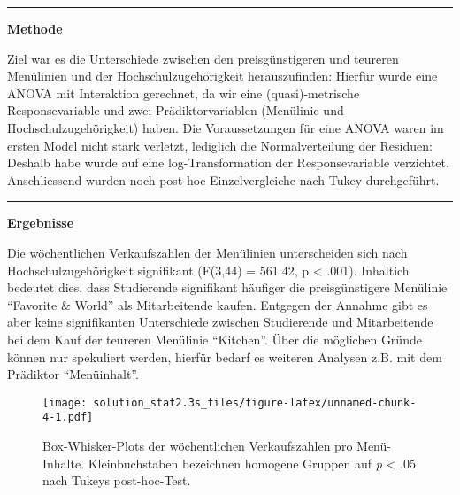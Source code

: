 \documentclass[
]{article}
\begin{document}
\begin{center}\rule{0.5\linewidth}{0.5pt}\end{center}

\textbf{Methode}

Ziel war es die Unterschiede zwischen den preisgünstigeren und teureren
Menülinien und der Hochschulzugehörigkeit herauszufinden: Hierfür wurde
eine ANOVA mit Interaktion gerechnet, da wir eine (quasi)-metrische
Responsevariable und zwei Prädiktorvariablen (Menülinie und
Hochschulzugehörigkeit) haben. Die Voraussetzungen für eine ANOVA waren
im ersten Model nicht stark verletzt, lediglich die Normalverteilung der
Residuen: Deshalb habe wurde auf eine log-Transformation der
Responsevariable verzichtet. Anschliessend wurden noch post-hoc
Einzelvergleiche nach Tukey durchgeführt.

\begin{center}\rule{0.5\linewidth}{0.5pt}\end{center}

\textbf{Ergebnisse}

Die wöchentlichen Verkaufszahlen der Menülinien unterscheiden sich nach
Hochschulzugehörigkeit signifikant (F(3,44) = 561.42, p \textless{}
.001). Inhaltich bedeutet dies, dass Studierende signifikant häufiger
die preisgünstigere Menülinie ``Favorite \& World'' als Mitarbeitende
kaufen. Entgegen der Annahme gibt es aber keine signifikanten
Unterschiede zwischen Studierende und Mitarbeitende bei dem Kauf der
teureren Menülinie ``Kitchen''. Über die möglichen Gründe können nur
spekuliert werden, hierfür bedarf es weiteren Analysen z.B. mit dem
Prädiktor ``Menüinhalt''.

\begin{figure}
\centering
\texttt{[image: solution\_stat2.3s\_files/figure-latex/unnamed-chunk-4-1.pdf]}
\caption{Box-Whisker-Plots der wöchentlichen Verkaufszahlen pro
Menü-Inhalte. Kleinbuchstaben bezeichnen homogene Gruppen auf \emph{p}
\textless{} .05 nach Tukeys post-hoc-Test.}
\end{figure}
\end{document}
